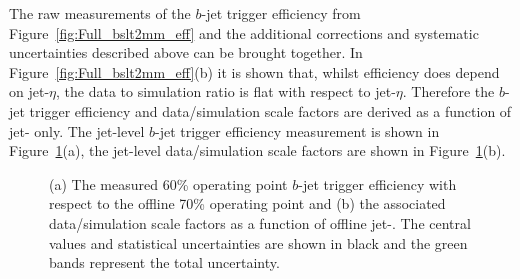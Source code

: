 \clearpage

The raw measurements of the $b$-jet trigger efficiency from Figure~\ref{fig:Full_bslt2mm_eff}
and the additional corrections and systematic uncertainties described above can be brought together.
In Figure~\ref{fig:Full_bslt2mm_eff}(b) it is shown that, whilst efficiency does depend on jet-$\eta$,
the data to simulation ratio is flat with respect to jet-$\eta$.
Therefore the $b$-jet trigger efficiency and data/simulation scale factors are derived as a function of jet-\pT{} only. 
The jet-level $b$-jet trigger efficiency measurement is shown in Figure~\ref{fig:bTrig_jetSys}(a),
the jet-level data/simulation scale factors are shown in Figure~\ref{fig:bTrig_jetSys}(b).

\begin{figure}[!ht]
  \begin{center}
    \captionsetup[subfigure]{aboveskip=0pt,justification=centering}
   
  \end{center}
  \caption[
    The $b$-jet trigger efficiency measured in data and the associated data/simulation scale factors as a function of offline jet-\pT.]
          {\label{fig:bTrig_jetSys}
    (a) The measured 60\% operating point $b$-jet trigger efficiency with respect to the offline 70\% operating point
    and (b) the associated data/simulation scale factors as a function of offline jet-\pT.
    The central values and statistical uncertainties are shown in black and the green bands represent the total uncertainty.}
\end{figure}

